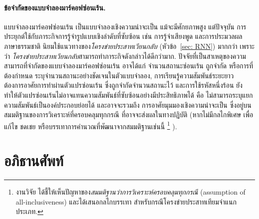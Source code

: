 \paragraph{ข้อจำกัดของแบบจำลองมาร์คอฟซ่อนเร้น.}
แบบจำลองมาร์คอฟซ่อนเร้น เป็นแบบจำลองเชิงความน่าจะเป็น
แม้จะมีศักยภาพสูง
แต่ปัจจุบัน
การประยุกต์ใช้กับภาระกิจการรู้จำรูปแบบเชิงลำดับที่ซับซ้อน เช่น การรู้จำเสียงพูด และการประมวลผลภาษาธรรมชาติ
นิยมใช้แนวทางของ\textit{โครงข่ายประสาทเวียนกลับ} (หัวข้อ~\ref{sec: RNN}) มากกว่า
เพราะว่า \textit{โครงข่ายประสาทเวียนกลับ}สามารถทำภาระกิจดังกล่าวได้ดีกว่ามาก.
ปัจจัยที่เป็นสาเหตุของความสามารถที่จำกัดของแบบจำลองมาร์คอฟซ่อนเร้น
อาจได้แก่
จำนวนสถานะซ่อนเร้น ถูกจำกัด 
หรือการที่ต้องกำหนด ระบุจำนวนสถานะอย่างชัดเจนในตัวแบบจำลอง,
การเรียนรู้ความสัมพันธ์ระยะยาว ต้องการอาศัยการทำผ่านตัวแปรซ่อนเร้น ซึ่งถูกจำกัดจำนวนสถานะไว้ 
และการใช้รหัสหนึ่งร้อน ยังทำให้ตัวแปรซ่อนเร้นไม่อาจแทนความสัมพันธ์ที่ซับซ้อนอย่างมีประสิทธิภาพได้ คือ ไม่สามารถระบุแยกความสัมพันธ์เป็นองค์ประกอบย่อยได้
และอาจจะรวมถึง
การอาศัยมุมมองเชิงความน่าจะเป็น ซึ่งอยู่บนสมมติฐานของการวิเคราะห์ที่ครอบคลุมทุกกรณี ที่อาจจะส่งผลในทางปฏิบัติ (หากไม่มีกลไกพิเศษ เพื่อแก้ไข ชดเชย หรือบรรเทาการคำนวณที่พัฒนาจากสมมติฐานเช่นนี้%
\footnote{%
งานวิจัย \cite{NakjaiK18, NakjaiEtAl2019a} ได้ชี้ให้เห็นปัญหาของ\textit{สมมติฐานว่าการวิเคราะห์ครอบคลุมทุกกรณี} (assumption of all-inclusiveness) และได้เสนอกลไกบรรเทา สำหรับกรณีโครงข่ายประสาทเทียมจำแนกประเภท.
}%
).

\section{อภิธานศัพท์}

